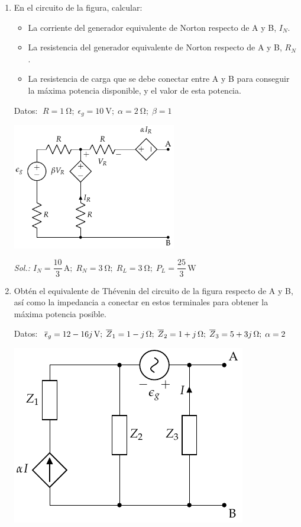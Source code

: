 \begin{enumerate}
  \item En el circuito de la figura, calcular:
    \begin{itemize}
    \item La corriente del generador equivalente de Norton respecto de
      A y B, $I_N$.
    \item La resistencia del generador equivalente de Norton respecto
      de A y B, $R_N$.
    \item La resistencia de carga que se debe conectar entre A y B
      para conseguir la máxima potencia disponible, y el valor de esta
      potencia.
    \end{itemize}
    Datos:
    $\; R = \qty{1}{\ohm};\; \epsilon_g = \qty{10}{\volt};\; \alpha = \qty{2}{\ohm};\; \beta = 1$

    \begin{center}
      \includegraphics[height=5.5cm]{../figs/norton.pdf}
    \end{center}

\emph{Sol.:\;
  $I_N=\dfrac{10}{3}\,\si{\ampere};\; R_N=\qty{3}{\ohm};\; R_L=\qty{3}{\ohm};\;
  P_L=\dfrac{25}{3}\,\si{\watt}$}

\item   Obtén el equivalente de Thévenin del circuito de la figura
  respecto de A y B, así como la impedancia a conectar en estos terminales para obtener la máxima potencia posible.

Datos: $\; \overline{\epsilon}_g = \qty[parse-numbers=false]{12 - 16j}{\volt};\;
  \overline{Z}_1 = \qty[parse-numbers=false]{1 - j}{\ohm};\;
  \overline{Z}_2 = \qty[parse-numbers=false]{1 + j}{\ohm};\;
  \overline{Z}_3 = \qty[parse-numbers=false]{5 + 3j}{\ohm};\;
  \alpha = 2 $
  
\begin{center}
  \includegraphics{../figs/Thevenin4}
\end{center}


\end{enumerate}
